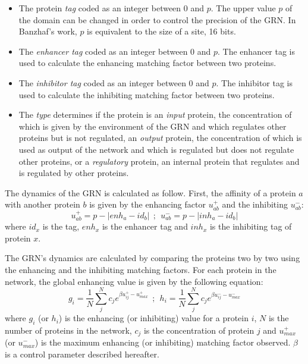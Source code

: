 \documentclass[conference]{IEEEtran}
\begin{document}
\begin{itemize}

\item The protein \emph{tag} coded as an integer between 0 and $p$. The
	upper value $p$ of the domain can be changed in order to control the
	precision of the GRN. In Banzhaf's work, $p$ is equivalent to the size
of a site, 16 bits. 

\item The \emph{enhancer tag} coded as an integer between 0 and $p$. The
	enhancer tag is used to calculate the enhancing matching factor
	between two proteins.

\item The \emph{inhibitor tag} coded as an integer between 0 and $p$. The
	inhibitor tag is used to calculate the inhibiting matching factor
	between two proteins.

\item The \emph{type} determines if the protein is an \emph{input} protein, the
	concentration of which is given by the environment of the GRN and which
	regulates other proteins but is not regulated, an \emph{output} protein,
	the concentration of which is used as output of the network and which is
	regulated but does not regulate other proteins, or a \emph{regulatory}
	protein, an internal protein that regulates and is regulated by other
	proteins.

\end{itemize}

The dynamics of the GRN is calculated as follow. First, the affinity of a
protein $a$ with another protein $b$ is given by the enhancing factor
$u^{+}_{ab}$ and the inhibiting $u^{-}_{ab}$:
\begin{equation}
u^{+}_{ab}=p-|enh_a-id_b|~~;~~u^{-}_{ab}=p-|inh_a-id_b|
\end{equation}
where $id_x$ is the tag, $enh_x$ is the enhancer tag and $inh_x$
is the inhibiting tag of protein $x$.

The GRN's dynamics are calculated by comparing the proteins two by two using the
enhancing and the inhibiting matching factors. For each protein in the network,
the global enhancing value is given by the following equation:
\begin{equation}
g_i=\frac{1}{N}\sum_j^N{c_je^{\beta u^{+}_{ij}-u_{max}^{+}}}~~;~~h_i=\frac{1}{N}\sum_j^N{c_je^{\beta u^{-}_{ij}-u_{max}^{-}}}
\end{equation}
where $g_i$ (or $h_i$) is the enhancing (or inhibiting) value for a
protein $i$, $N$ is the number of proteins in the network, $c_j$ is the
concentration of protein $j$ and $u_{max}^{+}$ (or $u_{max}^{-}$) is the
maximum enhancing (or inhibiting) matching factor observed. $\beta$ is a
control parameter described hereafter.
\end{document}
